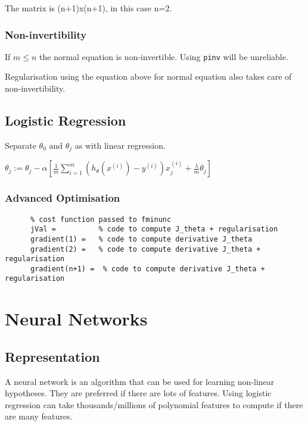 \documentclass[12pt, a4paper]{article}
\begin{document}
      The matrix is (n+1)x(n+1), in this case n=2.

    \subsubsection{Non-invertibility}

      If $m \leq n$ the normal equation is non-invertible. Using \texttt{pinv}
      will be unreliable. 

      Regularisation using the equation above for normal equation also takes
      care of non-invertibility. 

  \subsection{Logistic Regression}

    Separate $\theta_0 \text{ and } \theta_j$ as with linear regression.

    $\theta_j := \theta_j - \alpha [\frac{1}{m} \displaystyle\sum_{i=1}^m
    (h_\theta(x^{(i)}) - y^{(i)}) x_j^{(i)} + \frac{\lambda}{m} \theta_j]$

    \subsubsection{Advanced Optimisation}

      \begin{lstlisting}
      % cost function passed to fminunc
      jVal =          % code to compute J_theta + regularisation
      gradient(1) =   % code to compute derivative J_theta
      gradient(2) =   % code to compute derivative J_theta + regularisation
      gradient(n+1) =  % code to compute derivative J_theta + regularisation
      \end{lstlisting}

  \newpage

\section{Neural Networks}

  \subsection{Representation}

    A neural network is an algorithm that can be used for learning non-linear
    hypotheses. They are preferred if there are lots of features. Using 
    logistic regression can take thousands/millions of polynomial features 
    to compute if there are many features. 
\end{document}
